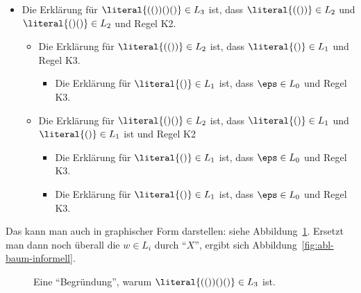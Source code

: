 \begin{itemize}
\item Die Erklärung für $\literal{(())()()}\in L_3$ ist, dass
  $\literal{(())}\in L_2$ und $\literal{()()}\in L_2$ und Regel K2.
  \begin{itemize}
  \item Die Erklärung für $\literal{(())}\in L_2$ ist, dass 
    $\literal{()}\in L_1$ und Regel K3.
    \begin{itemize}
    \item Die Erklärung für $\literal{()}\in L_1$ ist, dass
      $\eps\in L_0$ und Regel K3.
    \end{itemize}
  \item Die Erklärung für $\literal{()()}\in L_2$ ist, dass
    $\literal{()}\in L_1$ und $\literal{()}\in L_1$ ist und Regel K2
    \begin{itemize}
    \item Die Erklärung für $\literal{()}\in L_1$ ist, dass
      $\eps\in L_0$ und Regel K3.
    \item Die Erklärung für $\literal{()}\in L_1$ ist, dass
      $\eps\in L_0$ und Regel K3.
    \end{itemize}
  \end{itemize}
\end{itemize}
%
Das kann man auch in graphischer Form darstellen: siehe
Abbildung~\ref{fig:baum-begruendung}. Ersetzt man dann noch überall
die $w\in L_i$ durch "`$X$"', ergibt sich
Abbildung~\ref{fig:abl-baum-informell}.

\begin{figure}[ht]
  \centering
  
  \caption{Eine "`Begründung"', warum $\literal{(())()()}\in L_3$ ist.} %
  \label{fig:baum-begruendung}
\end{figure}

